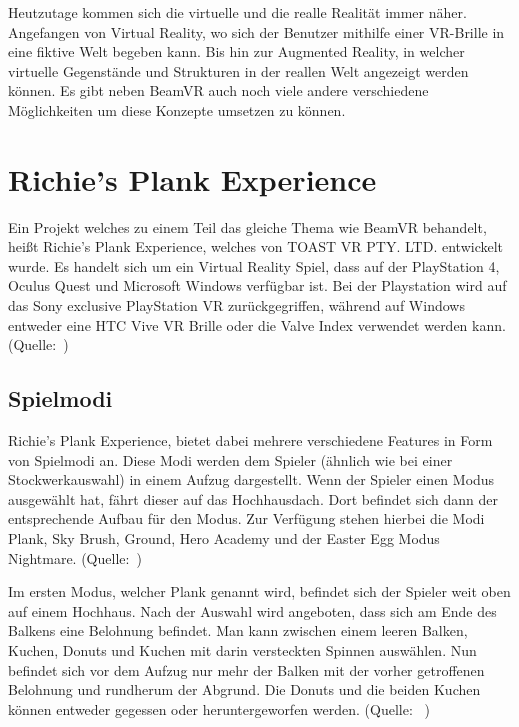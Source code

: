 %

Heutzutage kommen sich die virtuelle und die realle Realität immer näher.
Angefangen von Virtual Reality, wo sich der Benutzer mithilfe einer VR-Brille in eine fiktive Welt begeben kann.
Bis hin zur Augmented Reality, in welcher virtuelle Gegenstände und Strukturen in der reallen Welt angezeigt werden können.
Es gibt neben BeamVR auch noch viele andere verschiedene Möglichkeiten um diese Konzepte umsetzen zu können.



\section{Richie's Plank Experience}
\label{sec:richiesplankexperience}
Ein Projekt welches zu einem Teil das gleiche Thema wie BeamVR behandelt, heißt Richie's Plank Experience, welches von TOAST VR PTY. LTD. entwickelt wurde.
Es handelt sich um ein Virtual Reality Spiel, dass auf der PlayStation 4, Oculus Quest und Microsoft Windows verfügbar ist.
Bei der Playstation wird auf das Sony exclusive PlayStation VR zurückgegriffen, während auf Windows entweder eine HTC Vive VR Brille oder die Valve Index verwendet werden kann.
(Quelle:~\cite{ToastGames_2021})

\subsection{Spielmodi}
\label{sec:richiesplankexperience_modes}
Richie's Plank Experience, bietet dabei mehrere verschiedene Features in Form von Spielmodi an.
Diese Modi werden dem Spieler (ähnlich wie bei einer Stockwerkauswahl) in einem Aufzug dargestellt.
Wenn der Spieler einen Modus ausgewählt hat, fährt dieser auf das Hochhausdach.
Dort befindet sich dann der entsprechende Aufbau für den Modus.
Zur Verfügung stehen hierbei die Modi Plank, Sky Brush, Ground, Hero Academy und der Easter Egg Modus Nightmare.
(Quelle:~\cite{ToastGames_2021_Steam})

Im ersten Modus, welcher Plank genannt wird, befindet sich der Spieler weit oben auf einem Hochhaus.
Nach der Auswahl wird angeboten, dass sich am Ende des Balkens eine Belohnung befindet.
Man kann zwischen einem leeren Balken, Kuchen, Donuts und Kuchen mit darin versteckten Spinnen auswählen.
Nun befindet sich vor dem Aufzug nur mehr der Balken mit der vorher getroffenen Belohnung und rundherum der Abgrund.
Die Donuts und die beiden Kuchen können entweder gegessen oder heruntergeworfen werden.
(Quelle: ~\cite{ToastGames_2021_Steam})

